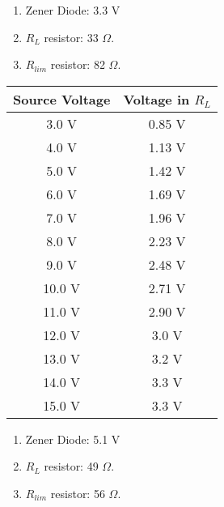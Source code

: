 \begin{multicols}{3}
\begin{tasks}
\begin{enumerate}
\item Zener Diode: 3.3 V
\item $R_{L}$ resistor: 33 $\Omega$.
\item $R_{lim}$ resistor: 82 $\Omega$.
\end{enumerate}

\begin{center}
\begin{tabular}[.5cm]{ c c }
\toprule
Source Voltage & Voltage in $R_{L}$ \\
\midrule
3.0 V & 0.85 V \\
\cmidrule{1-2}
4.0 V & 1.13 V \\
\cmidrule{1-2}
5.0 V & 1.42 V \\
\cmidrule{1-2}
6.0 V & 1.69 V \\
\cmidrule{1-2}
7.0 V & 1.96 V \\
\cmidrule{1-2}
8.0 V & 2.23 V \\
\cmidrule{1-2}
9.0 V & 2.48 V \\
\cmidrule{1-2}
10.0 V & 2.71 V \\
\cmidrule{1-2}
11.0 V & 2.90 V \\
\cmidrule{1-2}
12.0 V & 3.0 V \\
\cmidrule{1-2}
13.0 V & 3.2 V \\
\cmidrule{1-2}
14.0 V & 3.3 V \\
\cmidrule{1-2}
15.0 V & 3.3 V \\
\bottomrule
\end{tabular}
\end{center} 


\begin{enumerate}
\item Zener Diode: 5.1 V
\item $R_{L}$ resistor: 49 $\Omega$.
\item $R_{lim}$ resistor: 56 $\Omega$.
\end{enumerate}


\end{tasks}
\end{multicols}
